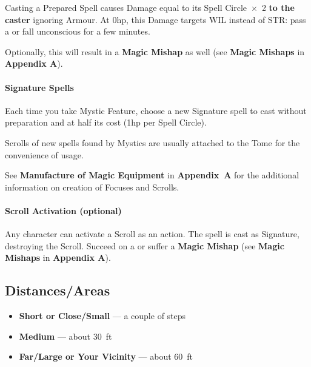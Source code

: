 \documentclass[itdr]{subfiles}
\begin{document}
Casting a Prepared Spell causes Damage equal to its Spell Circle~$\times$~2 \textbf{to the caster} ignoring Armour. At 0hp, this Damage targets WIL instead of STR: pass a  or fall unconscious for a few minutes.
\begin{dbox}
Optionally, this will result in a \textbf{Magic Mishap} as well (see \textbf{Magic Mishaps} in \textbf{Appendix A}).
\end{dbox}

\vfill

\paragraph{Signature Spells}
Each time you take Mystic Feature, choose a new Signature spell to cast without preparation and at half its cost (1hp per Spell Circle).

\vfill

\begin{dbox}
	Scrolls of new spells found by Mystics are usually attached to the Tome for the convenience of usage.
	
	See \textbf{Manufacture of Magic Equipment} in \mbox{\textbf{Appendix A}} for the additional information on creation of Focuses and Scrolls.
\end{dbox}

\break

\begin{dbox}
	\paragraph{Scroll Activation (optional)}
	Any character can activate a Scroll as an action. The spell is cast as Signature, destroying the Scroll. Succeed on a  or suffer a \textbf{Magic Mishap} (see \textbf{Magic Mishaps} in \textbf{Appendix A}).
\end{dbox}

\vfill


\begin{dbox}
	\subsection*{Distances/Areas}
	\begin{itemize}
		\item \textbf{Short or Close/Small} --- a couple of steps
		\item \textbf{Medium} --- about 30~ft
		\item \textbf{Far/Large or Your Vicinity} --- about 60~ft
	\end{itemize}
\end{dbox}
\end{document}
